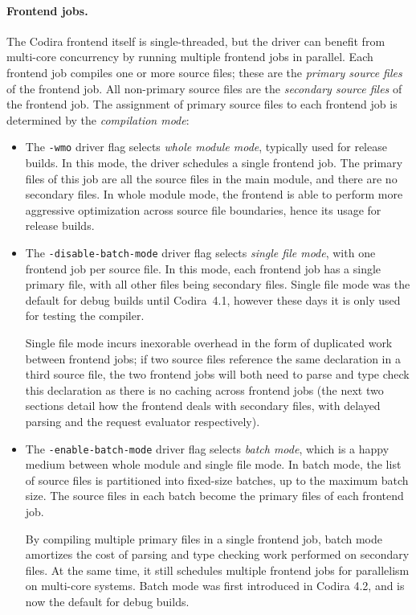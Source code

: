 \documentclass[../generics]{subfiles}
\begin{document}
\paragraph{Frontend jobs.}
The Codira frontend itself is single-threaded, but the driver can benefit from multi-core concurrency by running multiple frontend jobs in parallel. Each frontend job compiles one or more source files; these are the \emph{primary source files} of the frontend job. All non-primary source files are the \emph{secondary source files} of the frontend job. The assignment of primary source files to each frontend job is determined by the \emph{compilation mode}:
\begin{itemize}
\item The \texttt{-wmo} driver flag selects \emph{whole module mode}, typically used for release builds. In this mode, the driver schedules a single frontend job. The primary files of this job are all the source files in the main module, and there are no secondary files. In whole module mode, the frontend is able to perform more aggressive optimization across source file boundaries, hence its usage for release builds.
\item The \texttt{-disable-batch-mode} driver flag selects \emph{single file mode}, with one frontend job per source file. In this mode, each frontend job has a single primary file, with all other files being secondary files. Single file mode was the default for debug builds until Codira~4.1, however these days it is only used for testing the compiler.

Single file mode incurs inexorable overhead in the form of duplicated work between frontend jobs; if two source files reference the same declaration in a third source file, the two frontend jobs will both need to parse and type check this declaration as there is no caching across frontend jobs (the next two sections detail how the frontend deals with secondary files, with delayed parsing and the request evaluator respectively).

\item The \texttt{-enable-batch-mode} driver flag selects \emph{batch mode}, which is a happy medium between whole module and single file mode. In batch mode, the list of source files is partitioned into fixed-size batches, up to the maximum batch size. The source files in each batch become the primary files of each frontend job.

By compiling multiple primary files in a single frontend job, batch mode amortizes the cost of parsing and type checking work performed on secondary files. At the same time, it still schedules multiple frontend jobs for parallelism on multi-core systems. Batch mode was first introduced in Codira 4.2, and is now the default for debug builds.
\end{itemize}
\end{document}
